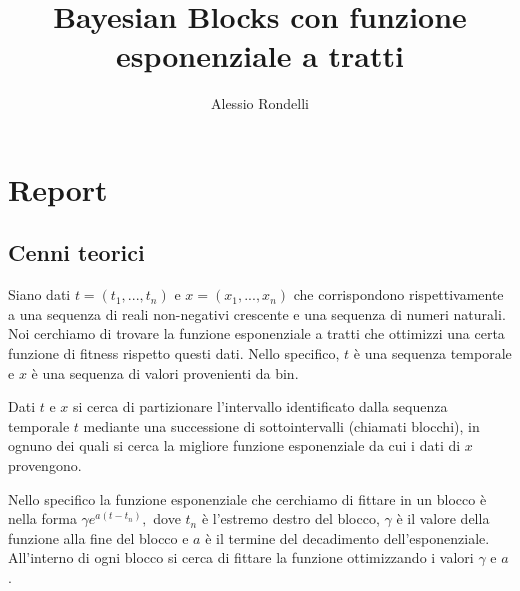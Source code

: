 \documentclass[10pt,a4paper]{report}
\author{Alessio Rondelli}
\title{Bayesian Blocks con funzione esponenziale a tratti}
\begin{document}
\maketitle
\chapter{Report}
\section{Cenni teorici}
Siano dati $t=(t_1,...,t_n)$ e $x=(x_1,...,x_n)$ che corrispondono rispettivamente a una sequenza di reali non-negativi crescente e una sequenza di numeri naturali. Noi cerchiamo di trovare la funzione esponenziale a tratti che ottimizzi una certa funzione di fitness rispetto questi dati. Nello specifico, $t$ è una sequenza temporale e $x$ è una sequenza di valori provenienti da bin.

Dati $t$ e $x$ si cerca di partizionare l'intervallo identificato dalla sequenza temporale $t$ mediante una successione di sottointervalli (chiamati blocchi), in ognuno dei quali si cerca la migliore funzione esponenziale da cui i dati di $x$ provengono.

Nello specifico la funzione esponenziale che cerchiamo di fittare in un blocco è nella forma $\gamma e^{a(t-t_n)},$ dove $t_n$ è l'estremo destro del blocco, $\gamma$ è il valore della funzione alla fine del blocco e $a$ è il termine del decadimento dell'esponenziale. All'interno di ogni blocco si cerca di fittare la funzione ottimizzando i valori $\gamma$ e $a$.
\end{document}
